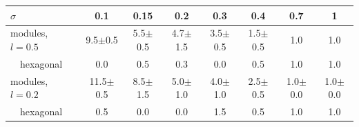 \begin{tabular}{lccccccc}
\toprule
$\sigma$ & 0.1 & 0.15 & 0.2 & 0.3 & 0.4 & 0.7 & 1 \\
\midrule
modules, $l{=}0.5$ & 9.5$\pm$0.5 & 5.5$\pm$0.5 & 4.7$\pm$1.5 & 3.5$\pm$0.5 & 1.5$\pm$0.5 & 1.0 & 1.0 \\
~~hexagonal & 0.0 & 0.5 & 0.3 & 0.0 & 0.5 & 1.0 & 1.0 \\
modules, $l{=}0.2$ & 11.5$\pm$0.5 & 8.5$\pm$1.5 & 5.0$\pm$1.0 & 4.0$\pm$1.0 & 2.5$\pm$0.5 & 1.0$\pm$0.0 & 1.0$\pm$0.0 \\
~~hexagonal & 0.5 & 0.0 & 0.0 & 1.5 & 0.5 & 1.0 & 1.0 \\
\bottomrule
\end{tabular}
